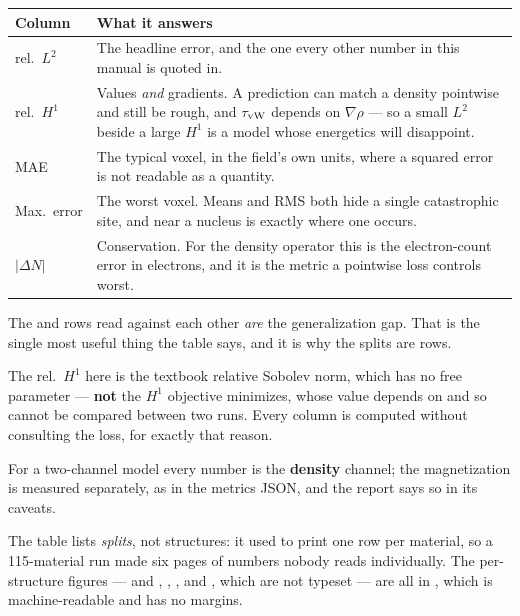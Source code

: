 \begin{center}
\begin{tabular}{@{}lp{8.4cm}@{}}
\toprule
Column & What it answers \\
\midrule
rel.\ $L^2$ & The headline error, and the one every other number in this
manual is quoted in. \\
rel.\ $H^1$ & Values \emph{and} gradients. A prediction can match a density
pointwise and still be rough, and $\tau_{\mathrm{vW}}$ depends on $\nabla\rho$ --- so a
small $L^2$ beside a large $H^1$ is a model whose energetics will disappoint. \\
MAE & The typical voxel, in the field's own units, where a squared error is not
readable as a quantity. \\
Max.\ error & The worst voxel. Means and RMS both hide a single catastrophic
site, and near a nucleus is exactly where one occurs. \\
$|\Delta N|$ & Conservation. For the density operator this is the electron-count error
in electrons, and it is the metric a pointwise loss controls worst. \\
\bottomrule
\end{tabular}
\end{center}

\begin{ptip}
The  and  rows read against each other \emph{are}
the generalization gap. That is the single most useful thing the table says,
and it is why the splits are rows.
\end{ptip}

\begin{pnote}
The rel.\ $H^1$ here is the textbook relative Sobolev norm, which has no free
parameter --- \textbf{not} the $H^1$ objective 
minimizes, whose value depends on  and so cannot be
compared between two runs. Every column is computed without consulting the
loss, for exactly that reason.

For a two-channel model every number is the \textbf{density} channel; the
magnetization is measured separately, as  in
the metrics JSON, and the report says so in its caveats.

The table lists \emph{splits}, not structures: it used to print one row per
material, so a 115-material run made six pages of numbers nobody reads
individually. The per-structure figures --- and , ,
,  and , which are not typeset --- are all
in , which is machine-readable and has no margins.
\end{pnote}

